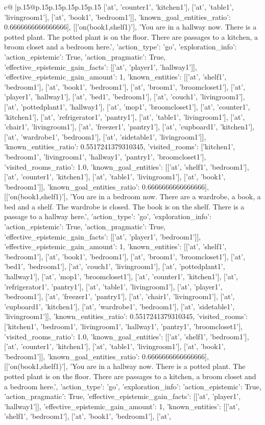 \documentclass{article}
\begin{document}
{\begin{supertabular}{c@{$\;$}|p{.15\linewidth}@{}p{.15\linewidth}p{.15\linewidth}p{.15\linewidth}p{.15\linewidth}p{.15\linewidth}}
{{{['at', 'counter1', 'kitchen1'], ['at', 'table1', 'livingroom1'], ['at', 'book1', 'bedroom1']], 'known_goal_entities_ratio': 0.6666666666666666}}], [['on(book1,shelf1)'], 'You are in a hallway now. There is a potted plant. The potted plant is on the floor. There are passages to a kitchen, a broom closet and a bedroom here.', {'action_type': 'go', 'exploration_info': {'action_epistemic': True, 'action_pragmatic': True, 'effective_epistemic_gain_facts': [['at', 'player1', 'hallway1']], 'effective_epistemic_gain_amount': 1, 'known_entities': [['at', 'shelf1', 'bedroom1'], ['at', 'book1', 'bedroom1'], ['at', 'broom1', 'broomcloset1'], ['at', 'player1', 'hallway1'], ['at', 'bed1', 'bedroom1'], ['at', 'couch1', 'livingroom1'], ['at', 'pottedplant1', 'hallway1'], ['at', 'mop1', 'broomcloset1'], ['at', 'counter1', 'kitchen1'], ['at', 'refrigerator1', 'pantry1'], ['at', 'table1', 'livingroom1'], ['at', 'chair1', 'livingroom1'], ['at', 'freezer1', 'pantry1'], ['at', 'cupboard1', 'kitchen1'], ['at', 'wardrobe1', 'bedroom1'], ['at', 'sidetable1', 'livingroom1']], 'known_entities_ratio': 0.5517241379310345, 'visited_rooms': ['kitchen1', 'bedroom1', 'livingroom1', 'hallway1', 'pantry1', 'broomcloset1'], 'visited_rooms_ratio': 1.0, 'known_goal_entities': [['at', 'shelf1', 'bedroom1'], ['at', 'counter1', 'kitchen1'], ['at', 'table1', 'livingroom1'], ['at', 'book1', 'bedroom1']], 'known_goal_entities_ratio': 0.6666666666666666}}], [['on(book1,shelf1)'], 'You are in a bedroom now. There are a wardrobe, a book, a bed and a shelf. The wardrobe is closed. The book is on the shelf. There is a passage to a hallway here.', {'action_type': 'go', 'exploration_info': {'action_epistemic': True, 'action_pragmatic': True, 'effective_epistemic_gain_facts': [['at', 'player1', 'bedroom1']], 'effective_epistemic_gain_amount': 1, 'known_entities': [['at', 'shelf1', 'bedroom1'], ['at', 'book1', 'bedroom1'], ['at', 'broom1', 'broomcloset1'], ['at', 'bed1', 'bedroom1'], ['at', 'couch1', 'livingroom1'], ['at', 'pottedplant1', 'hallway1'], ['at', 'mop1', 'broomcloset1'], ['at', 'counter1', 'kitchen1'], ['at', 'refrigerator1', 'pantry1'], ['at', 'table1', 'livingroom1'], ['at', 'player1', 'bedroom1'], ['at', 'freezer1', 'pantry1'], ['at', 'chair1', 'livingroom1'], ['at', 'cupboard1', 'kitchen1'], ['at', 'wardrobe1', 'bedroom1'], ['at', 'sidetable1', 'livingroom1']], 'known_entities_ratio': 0.5517241379310345, 'visited_rooms': ['kitchen1', 'bedroom1', 'livingroom1', 'hallway1', 'pantry1', 'broomcloset1'], 'visited_rooms_ratio': 1.0, 'known_goal_entities': [['at', 'shelf1', 'bedroom1'], ['at', 'counter1', 'kitchen1'], ['at', 'table1', 'livingroom1'], ['at', 'book1', 'bedroom1']], 'known_goal_entities_ratio': 0.6666666666666666}}], [['on(book1,shelf1)'], 'You are in a hallway now. There is a potted plant. The potted plant is on the floor. There are passages to a kitchen, a broom closet and a bedroom here.', {'action_type': 'go', 'exploration_info': {'action_epistemic': True, 'action_pragmatic': True, 'effective_epistemic_gain_facts': [['at', 'player1', 'hallway1']], 'effective_epistemic_gain_amount': 1, 'known_entities': [['at', 'shelf1', 'bedroom1'], ['at', 'book1', 'bedroom1'], ['at', }}}
\end{supertabular}}
\end{document}
